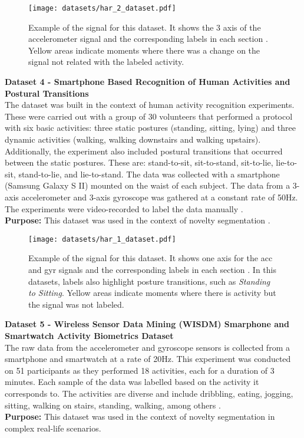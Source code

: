 \begin{figure}
\centering
\texttt{[image: datasets/har\_2\_dataset.pdf]}
\caption{Example of the signal for this dataset. It shows the 3 axis of the accelerometer signal and the corresponding labels in each section \cite{dataset2, dataset2_2}. Yellow areas indicate moments where there was a change on the signal not related with the labeled activity.}
\label{fig:har2_dataset}
\end{figure}
    
\textbf{Dataset 4 - Smartphone Based Recognition of Human Activities and Postural Transitions}\\
The dataset was built in the context of human activity recognition experiments. These were carried out with a group of 30 volunteers that performed a protocol with six basic activities: three static postures (standing, sitting, lying) and three dynamic activities (walking, walking downstairs and walking upstairs). Additionally, the experiment also included postural transitions that occurred between the static postures. These are: stand-to-sit, sit-to-stand, sit-to-lie, lie-to-sit, stand-to-lie, and lie-to-stand. The data was collected with a smartphone (Samsung Galaxy S II) mounted on the waist of each subject. The data from a 3-axis accelerometer and 3-axis gyroscope was gathered at a constant rate of 50Hz. The experiments were video-recorded to label the data manually \cite{dataset3}.\\
\textbf{Purpose:} This dataset was used in the context of novelty segmentation \cite{dataset3}.

\begin{figure}
\centering
\texttt{[image: datasets/har\_1\_dataset.pdf]}
\caption{Example of the signal for this dataset. It shows one axis for the \gls{acc} and \gls{gyr} signals and the corresponding labels in each section \cite{dataset3}. In this datasets, labels also highlight posture transitions, such as \textit{Standing to Sitting}. Yellow areas indicate moments where there is activity but the signal was not labeled.}
\label{fig:har1_dataset}
\end{figure}    
    
\textbf{Dataset 5 - Wireless Sensor Data Mining (WISDM) Smarphone and Smartwatch Activity Biometrics Dataset}\\
The raw data from the accelerometer and gyroscope sensors is collected from a smartphone and smartwatch at a rate of 20Hz. This experiment was conducted on 51 participants as they performed 18 activities, each for a duration of 3 minutes. Each sample of the data was labelled based on the activity it corresponds to. The activities are diverse and include dribbling, eating, jogging, sitting, walking on stairs, standing, walking, among others \cite{dataset4}.\\
\textbf{Purpose:} This dataset was used in the context of novelty segmentation in complex real-life scenarios.

